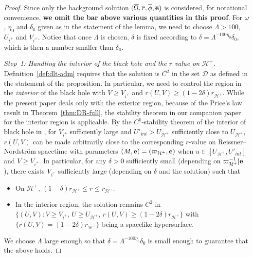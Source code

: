 \documentclass[10pt, reqno]{amsart}
\theoremstyle{definition}
\theoremstyle{remark}
\theoremstyle{conjecture}
\numberwithin{equation}{section}
\newcommand{\set}[1]{\{#1\}}
\newcommand{\0}{\emptyset}
\newcommand{\dlt}{\delta}
\newcommand{\Lmb}{\Lambda}
\newcommand{\omg}{\omega}
\newcommand{\Omg}{\Omega}
\newcommand{\bfe}{{\bf e}}
\newcommand{\calD}{\mathcal D}
\newcommand{\calH}{\mathcal H}
\newcommand{\de}{\delta}
\newcommand{\EH}{\calH^{+}}
\newcommand{\pfstep}[1]{\vspace{.5em} {\it \noindent #1.}}
\newcommand{\e}{\bfe}							%
\newcommand{\Omgbg}{\overline{\Omg}}				%
\newcommand{\phibg}{\overline{\phi}}				%
\newcommand{\rbg}{\overline{r}}					%
\newcommand{\ebg}{\overline{\e}}					%
\begin{document}
\begin{proof}
Since only the background solution $(\Omgbg, \rbg, \phibg, \ebg)$ is considered, for notational convenience, {\bf we omit the bar above various quantities in this proof}. For $\omg$, $\eta_{0}$ and $\dlt_{0}$ given as in the statement of the lemma, we need to choose $\Lmb > 100$, $U_{i^{+}}$ and $V_{i^{+}}$. Notice that once $\Lmb$ is chosen, $\de$ is fixed according to $\dlt = \Lmb^{-100 \eta_{0}} \dlt_{0}$, which is then a number smaller than $\dlt_{0}$.



\pfstep{Step~1: Handling the interior of the black hole and the $r$ value on $\EH$} 
Definition~\ref{def:dlt-adm} requires that the solution is $C^2$ in the set $\widetilde{\calD}$ as defined in the statement of the proposition. In particular, we need to control the region in the \emph{interior} of the black hole with $V\geq V_{i^{+}}$ and $r(U, V) \geq (1 - 2 \dlt) r_{\EH}$. While the present paper deals only with the exterior region, because of the Price's law result in Theorem~\ref{thm:DR-full}, the stability theorem in our companion paper \cite{LO.interior} for the interior region is applicable. By the $C^0$-stability theorem of the interior of black hole in \cite{LO.interior}, for $V_{i^{+}}$ sufficiently large and $U'_{int} > U_{\EH}$ sufficiently close to $U_{\EH}$, $r(U,V)$ can be made arbitrarily close to the corresponding $r$-value on Reissner--Nordstr\"om spacetime with parameters $(M,\e)=(\varpi_{\EH},\e)$ when $u\in [U_{\EH}, U'_{int}]$ and $V\geq V_{i^{+}}$. In particular, for any $\de>0$ sufficiently small (depending on $\varpi_{\EH}^{-1} |\e|$), there exists $V_{i^{+}}$ sufficiently large (depending on $\de$ and the solution) such that 
\begin{itemize}
\item On $\EH$, $(1-\de)r_{\EH}\leq r \leq r_{\EH}$.
\item In the interior region, the solution remains $C^2$ in  $\set{(U,V):V\geq V_{i^{+}},\, U\geq U_{\EH},\,r(U, V) \geq (1 - 2 \dlt) r_{\EH}}$ with $ \{r(U,V) =(1 - 2 \dlt) r_{\EH}\}$ being a spacelike hypersurface. 
\end{itemize}
We choose $\Lmb$ large enough so that $\de=\Lmb^{-100 \eta_{0}} \dlt_{0}$ is small enough to guarantee that the above holds.



\end{proof}
\end{document}
